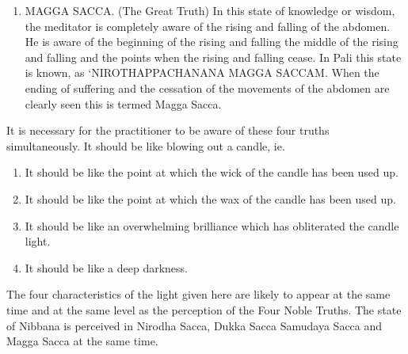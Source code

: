 \documentclass[a5paper,10pt,english]{book}
\begin{document}
\begin{enumerate}
\item {} 
\sphinxAtStartPar
MAGGA SACCA. (The Great Truth) In this state of knowledge or wisdom, the meditator is completely aware of the rising and falling of the abdomen. He is aware of the beginning of the rising and falling the middle of the rising and falling and the points when the rising and falling cease. In Pali this state is known, as ‘NIROTHAPPACHANANA MAGGA SACCAM. When the ending of suffering and the cessation of the movements of the abdomen are clearly seen this is termed Magga Sacca.

\end{enumerate}

\sphinxAtStartPar
It is necessary for the practitioner to be aware of these four truths simultaneously. It should be like blowing out a candle, ie.
\begin{enumerate}
%
\item {} 
\sphinxAtStartPar
It should be like the point at which the wick of the candle has been used up.

\item {} 
\sphinxAtStartPar
It should be like the point at which the wax of the candle has been used up.

\item {} 
\sphinxAtStartPar
It should be like an overwhelming brilliance which has obliterated the candle light.

\item {} 
\sphinxAtStartPar
It should be like a deep darkness.

\end{enumerate}

\sphinxAtStartPar
The four characteristics of the light given here are likely to appear at the same time and at the same level as the perception of the Four Noble Truths. The state of Nibbana is perceived in Nirodha Sacca, Dukka Sacca Samudaya Sacca and Magga Sacca at the same time.
\end{document}

